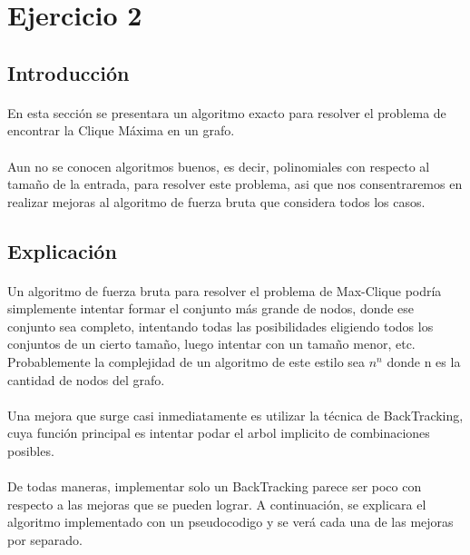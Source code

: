 \section{Ejercicio 2}

\subsection{Introducción}

\paragraph{}
En esta sección se presentara un algoritmo exacto para resolver el problema de encontrar la Clique Máxima en un grafo.


\paragraph{}
Aun no se conocen algoritmos buenos, es decir, polinomiales con respecto al tamaño de la entrada, para resolver 
este problema, asi que nos consentraremos en realizar mejoras al algoritmo de fuerza bruta que considera todos los casos.


\subsection{Explicación}

\paragraph{}
Un algoritmo de fuerza bruta para resolver el problema de Max-Clique podría simplemente intentar formar el conjunto más 
grande de nodos, donde ese conjunto sea completo, intentando todas las posibilidades eligiendo todos los conjuntos de un cierto tamaño,
luego intentar con un tamaño menor, etc. Probablemente la complejidad de un algoritmo de este estilo sea $n^n$ donde n es la cantidad 
de nodos del grafo.

\paragraph{}
Una mejora que surge casi inmediatamente es utilizar la técnica de BackTracking, cuya función principal es intentar podar el 
arbol implicito de combinaciones posibles. 

\paragraph{}
De todas maneras, implementar solo un BackTracking parece ser poco con respecto a las mejoras que se pueden lograr. A continuación, 
se explicara el algoritmo implementado con un pseudocodigo y se verá cada una de las mejoras por separado.

